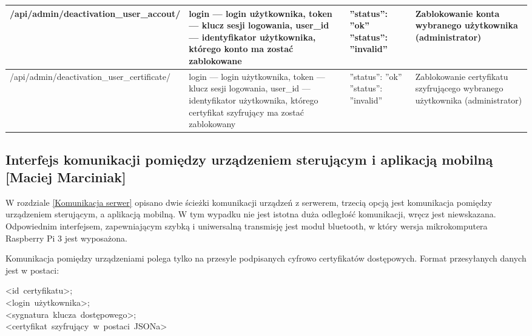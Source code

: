 \begin{landscape}
\begin{longtable}[!ht]{|m{5cm}|m{5cm}|m{4.7cm}|m{4cm}|}
		/api/admin/deactivation\-\_user\_accout/ & login --- login użytkownika, \newline token --- klucz sesji logowania, \newline user\_id --- identyfikator użytkownika, którego konto ma zostać zablokowane & ''status'': ''ok'' \tablinia ''status'': ''invalid'' & Zablokowanie konta wybranego użytkownika (administrator) \\ \hline
		/api/admin/deactivation\-\_user\_certificate/ & login --- login użytkownika, \newline token --- klucz sesji logowania, \newline user\_id --- identyfikator użytkownika, którego certyfikat szyfrujący ma zostać zablokowany & ''status'': ''ok'' \tablinia ''status'': ''invalid'' & Zablokowanie certyfikatu szyfrującego wybranego użytkownika (administrator) \\ \hline
	\end{longtable}\cite{programowanie_aplikacji_webowych}
\end{landscape}
\newpage
\subsection[Interfejs komunikacji pomiędzy urządzeniem sterującym i aplikacją mobilną]{Interfejs komunikacji pomiędzy urządzeniem \newline sterującym i aplikacją mobilną [Maciej Marciniak]}
W rozdziale \ref{Komunikacja serwer} opisano dwie ścieżki komunikacji urządzeń z serwerem, trzecią opcją jest komunikacja pomiędzy urządzeniem sterującym, a aplikacją mobilną. W tym wypadku nie jest istotna duża odległość komunikacji, wręcz jest niewskazana. Odpowiednim interfejsem, zapewniającym szybką i uniwersalną transmisję jest moduł bluetooth, w który wersja mikrokomputera Raspberry Pi 3 jest wyposażona. 

Komunikacja pomiędzy urządzeniami polega tylko na przesyle podpisanych cyfrowo certyfikatów dostępowych. Format przesyłanych danych jest w postaci: \\
\begin{minipage}[t]{\textwidth}
	<id~certyfikatu>;\\<login~użytkownika>;\\<sygnatura~klucza~dostępowego>;\\<certyfikat~szyfrujący~w~postaci~JSONa>
\end{minipage} 

\newpage
